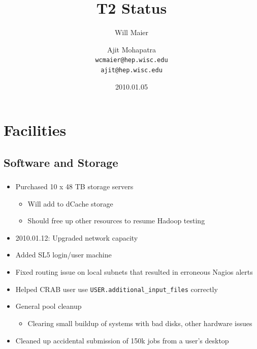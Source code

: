 \documentclass{beamer}
\title{T2 Status}
\author[Maier, Mohapatra]{
    Will Maier \and Ajit Mohapatra\\
    {\tt wcmaier@hep.wisc.edu}\\
    {\tt ajit@hep.wisc.edu}}
\institute[Wisconsin]{University of Wisconsin - High Energy Physics}
\date{2010.01.05}
\begin{document}
\begin{frame}
    \titlepage
\end{frame}


\section{Facilities}
\subsection{Software and Storage}
\begin{frame}
\frametitle{}

\begin{itemize}
	\item Purchased 10 x 48 TB storage servers
	\begin{itemize}
		\item Will add to dCache storage
		\item Should free up other resources to resume Hadoop testing
	\end{itemize}
	\item 2010.01.12: Upgraded network capacity
	\item Added SL5 login/user machine
	\item Fixed routing issue on local subnets that resulted in erroneous Nagios alerts
	\item Helped CRAB user use {\tt USER.additional\_input\_files} correctly
	\item General pool cleanup
	\begin{itemize}
		\item Clearing small buildup of systems with bad disks, other hardware issues
	\end{itemize}
	\item Cleaned up accidental submission of 150k jobs from a user's desktop
\end{itemize}
\end{frame}
\end{document}
